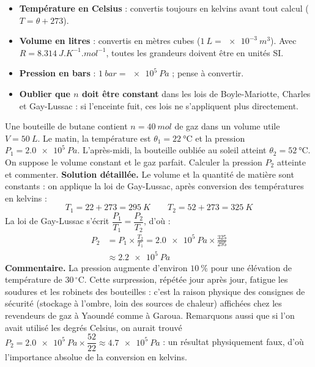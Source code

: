 \documentclass[11pt]{article}
\begin{document}
\begin{attention}[Pièges fréquents dans l'application de $PV = nRT$]
\begin{itemize}
\item \textbf{Température en Celsius} : convertis toujours en kelvins avant tout calcul ($T = \theta + 273$).
\item \textbf{Volume en litres} : convertis en mètres cubes ($\SI{1}{L} = \SI{e-3}{m^3}$). Avec $R = \SI{8,314}{J.K^{-1}.mol^{-1}}$, toutes les grandeurs doivent être en unités SI.
\item \textbf{Pression en bars} : $\SI{1}{bar} = \SI{e5}{Pa}$ ; pense à convertir.
\item \textbf{Oublier que $n$ doit être constant} dans les lois de Boyle-Mariotte, Charles et Gay-Lussac : si l'enceinte fuit, ces lois ne s'appliquent plus directement.
\end{itemize}
\end{attention}

\begin{exoresolu}
Une bouteille de butane contient $n = \SI{40}{mol}$ de gaz dans un volume utile $V = \SI{50}{L}$. Le matin, la température est $\theta_1 = \SI{22}{\celsius}$ et la pression $P_1 = \SI{2,0e5}{Pa}$. L'après-midi, la bouteille oubliée au soleil atteint $\theta_2 = \SI{52}{\celsius}$. On suppose le volume constant et le gaz parfait. Calculer la pression $P_2$ atteinte et commenter.
\tcblower
\textbf{Solution détaillée.} Le volume et la quantité de matière sont constants : on applique la loi de Gay-Lussac, après conversion des températures en kelvins :
\[ T_1 = 22 + 273 = \SI{295}{K} \qquad T_2 = 52 + 273 = \SI{325}{K} \]
La loi de Gay-Lussac s'écrit $\dfrac{P_1}{T_1} = \dfrac{P_2}{T_2}$, d'où :
\begin{align*}
P_2 &= P_1 \times \frac{T_2}{T_1} = \SI{2,0e5}{Pa} \times \frac{325}{295} \\
    &\approx \SI{2,2e5}{Pa}
\end{align*}
\textbf{Commentaire.} La pression augmente d'environ $10\ \%$ pour une élévation de température de $30\,^\circ\text{C}$. Cette surpression, répétée jour après jour, fatigue les soudures et les robinets des bouteilles : c'est la raison physique des consignes de sécurité (stockage à l'ombre, loin des sources de chaleur) affichées chez les revendeurs de gaz à Yaoundé comme à Garoua. Remarquons aussi que si l'on avait utilisé les degrés Celsius, on aurait trouvé $P_2 = \SI{2,0e5}{Pa} \times \dfrac{52}{22} \approx \SI{4,7e5}{Pa}$ : un résultat physiquement faux, d'où l'importance absolue de la conversion en kelvins.
\end{exoresolu}
\end{document}
